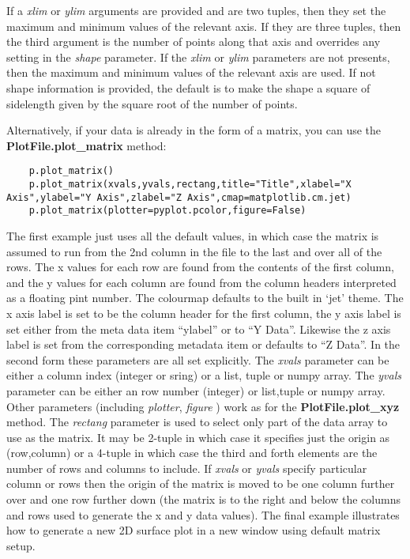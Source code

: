 \documentclass[a4paper,11pt]{scrartcl}
\begin{document}
If a \textit{xlim} or \textit{ylim} arguments are provided and are two tuples, then they set the maximum and minimum values of the relevant axis. If they are three tuples, then the third argument is the number of points along that axis and overrides any setting in the \textit{shape} parameter. If the \textit{xlim} or \textit{ylim} parameters are not presents, then the maximum and minimum values of the relevant axis are used. If not shape information is provided, the default is to make the shape a square of sidelength given by the square root of the number of points.

 Alternatively, if your data is already in the form of a matrix, you can use the \textbf{PlotFile.plot\_matrix} method:

 \begin{lstlisting}
    p.plot_matrix()
    p.plot_matrix(xvals,yvals,rectang,title="Title",xlabel="X Axis",ylabel="Y Axis",zlabel="Z Axis",cmap=matplotlib.cm.jet)
    p.plot_matrix(plotter=pyplot.pcolor,figure=False)
 \end{lstlisting}

 The first example just uses all the default values, in which case the matrix is assumed to run from the 2nd column in the file to the last and over all of the rows. The x values for each row are found from the contents of the first column, and the y values for each column are found from the column headers interpreted as a floating pint number. The colourmap defaults to the built in `jet' theme. The x axis label is set to be the column header for the first column, the y axis label is set either from the meta data item ``ylabel'' or to ``Y Data''. Likewise the z axis label is set from the corresponding metadata item or defaults to ``Z Data''. In the second form these parameters are all set explicitly. The \textit{xvals} parameter can be either a column index (integer or sring) or a list, tuple or numpy array. The \textit{yvals} parameter can be either an row number (integer) or list,tuple or numpy array. Other parameters (including \textit{plotter}, \textit{figure} \etc) work as for the \textbf{PlotFile.plot\_xyz} method. The \textit{rectang} parameter is used to select only part of the data array to use as the matrix. It may be 2-tuple in which case it specifies just the origin as (row,column) or a 4-tuple in which case the third and forth elements are the number of rows and columns to include. If \textit{xvals} or \textit{yvals} specify particular column or rows then the origin of the matrix is moved to be one column further over and one row further down (\ie the matrix is to the right and below the columns and rows used to generate the x and y data values). The final example illustrates how to generate a new 2D surface plot in a new window using default matrix setup.
\end{document}
